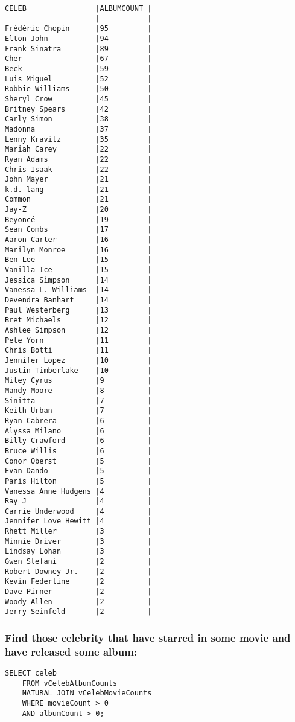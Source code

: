\documentclass{article}
\begin{document}
        \begin{verbatim}
CELEB                |ALBUMCOUNT |
---------------------|-----------|
Frédéric Chopin      |95         |
Elton John           |94         |
Frank Sinatra        |89         |
Cher                 |67         |
Beck                 |59         |
Luis Miguel          |52         |
Robbie Williams      |50         |
Sheryl Crow          |45         |
Britney Spears       |42         |
Carly Simon          |38         |
Madonna              |37         |
Lenny Kravitz        |35         |
Mariah Carey         |22         |
Ryan Adams           |22         |
Chris Isaak          |22         |
John Mayer           |21         |
k.d. lang            |21         |
Common               |21         |
Jay-Z                |20         |
Beyoncé              |19         |
Sean Combs           |17         |
Aaron Carter         |16         |
Marilyn Monroe       |16         |
Ben Lee              |15         |
Vanilla Ice          |15         |
Jessica Simpson      |14         |
Vanessa L. Williams  |14         |
Devendra Banhart     |14         |
Paul Westerberg      |13         |
Bret Michaels        |12         |
Ashlee Simpson       |12         |
Pete Yorn            |11         |
Chris Botti          |11         |
Jennifer Lopez       |10         |
Justin Timberlake    |10         |
Miley Cyrus          |9          |
Mandy Moore          |8          |
Sinitta              |7          |
Keith Urban          |7          |
Ryan Cabrera         |6          |
Alyssa Milano        |6          |
Billy Crawford       |6          |
Bruce Willis         |6          |
Conor Oberst         |5          |
Evan Dando           |5          |
Paris Hilton         |5          |
Vanessa Anne Hudgens |4          |
Ray J                |4          |
Carrie Underwood     |4          |
Jennifer Love Hewitt |4          |
Rhett Miller         |3          |
Minnie Driver        |3          |
Lindsay Lohan        |3          |
Gwen Stefani         |2          |
Robert Downey Jr.    |2          |
Kevin Federline      |2          |
Dave Pirner          |2          |
Woody Allen          |2          |
Jerry Seinfeld       |2          |
        \end{verbatim}
        
        
        \subsubsection*{Find those celebrity that have starred in some movie and have released some album:}
        \begin{verbatim}
SELECT celeb
    FROM vCelebAlbumCounts
    NATURAL JOIN vCelebMovieCounts
    WHERE movieCount > 0
    AND albumCount > 0;\end{verbatim}
    
\end{document}
